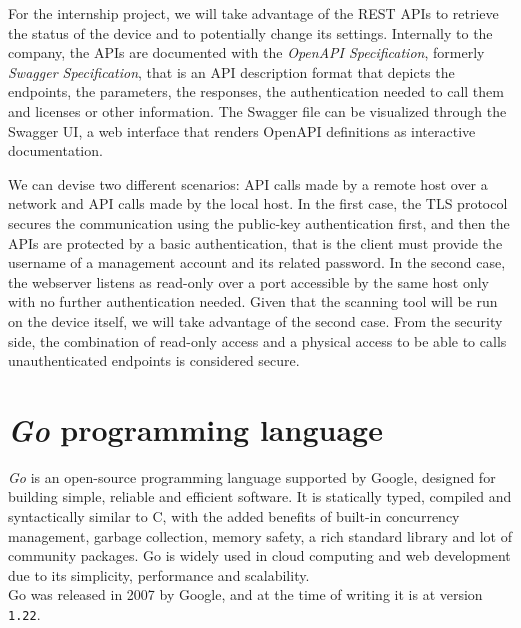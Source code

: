 For the internship project, we will take advantage of the REST APIs to retrieve the status of the device and to potentially change its settings. Internally to the company, the APIs are documented with the \textit{OpenAPI Specification}, formerly \textit{Swagger Specification}, that is an API description format that depicts the endpoints, the parameters, the responses, the authentication needed to call them and licenses or other information. The Swagger file can be visualized through the Swagger UI, a web interface that renders OpenAPI definitions as interactive documentation.~\cite{openapi-swagger}

We can devise two different scenarios: API calls made by a remote host over a network and API calls made by the local host. In the first case, the TLS protocol secures the communication using the public-key authentication first, and then the APIs are protected by a basic authentication, that is the client must provide the username of a management account and its related password. In the second case, the webserver listens as read-only over a port accessible by the same host only with no further authentication needed. Given that the scanning tool will be run on the device itself, we will take advantage of the second case. From the security side, the combination of read-only access and a physical access to be able to calls unauthenticated endpoints is considered secure.

\section{\textit{Go} programming language}
\label{sec:go-lang}

\textit{Go} is an open-source programming language supported by Google, designed for building simple, reliable and efficient software. It is statically typed, compiled and syntactically similar to C, with the added benefits of built-in concurrency management, garbage collection, memory safety, a rich standard library and lot of community packages. Go is widely used in cloud computing and web development due to its simplicity, performance and scalability.~\cite{go-lang-site}~\cite{go-lang-wikipedia}\\
Go was released in 2007 by Google, and at the time of writing it is at version \texttt{1.22}.


